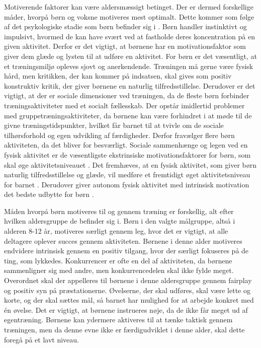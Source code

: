 Motiverende faktorer kan være aldersmæssigt betinget. Der er dermed forskellige måder, hvorpå børn og voksne motiveres mest optimalt. Dette kommer som følge af det psykologiske stadie som børn befinder sig i \citep{V.Brown2007}. Børn handler instinktivt og impulsivt, hvormed de kan have svært ved at fastholde deres koncentration på en given aktivitet. Derfor er det vigtigt, at børnene har en motivationsfaktor som giver dem glæde og lysten til at udføre en aktivitet. \citep{V.Brown2007} \newline
For børn er det væsentligt, at et træningsmiljø opleves sjovt og anerkendende. Træningen må gerne være fysisk hård, men kritikken, der kan kommer på indsatsen, skal gives som positiv konstruktiv kritik, der giver børnene en naturlig tilfredsstillelse. Derudover er det vigtigt, at der er sociale dimensioner ved træningen, da de fleste børn forbinder træningsaktiviteter med et socialt fællesskab. Der opstår imidlertid problemer med gruppetræningsaktiviteter, da børnene kan være forhindret i at møde til de givne træningstidspunkter, hvilket får barnet til at tvivle om de sociale tilhørsforhold og egen udvikling af færdigheder. Derfor fravælger flere børn aktiviteten, da det bliver for besværligt. \citep{Wied2011,Romani2013}\newline
Sociale sammenhænge og legen ved en fysisk aktivitet er de væsentligste  ekstrinsiske motivationsfaktorer for børn, som skal øge aktivitetsniveauet \citep{McWhorter2003,J.Sebire2013}. Det fremhæves, at en fysisk aktivitet, som giver børn naturlig tilfredsstillelse og glæde, vil medføre et fremtidigt øget aktivitetsniveau for barnet \citep{Romani2013}. Derudover giver autonom fysisk aktivitet med intrinsisk motivation det bedste udbytte for børn \citep{J.Sebire2013}.

Måden hvorpå børn motiveres til og gennem træning er forskellig, alt efter hvilken aldersgruppe de befinder sig i. Børn i den valgte målgruppe, altså i alderen 8-12 år, motiveres særligt gennem leg, hvor det er vigtigt, at alle deltagere oplever succes gennem aktiviteten. Børnene i denne alder motiveres endvidere intrinsisk gennem en positiv tilgang, hvor der særligt fokuseres på de ting, som lykkedes. Konkurrencer er ofte en del af aktiviteten, da børnene sammenligner sig med andre, men konkurrencedelen skal ikke fylde meget. Overordnet skal der appelleres til børnene i denne aldersgruppe gennem fairplay og positiv syn på præstationerne. Øvelserne, der skal udføres, skal være lette og korte, og der skal sættes mål, så barnet har mulighed for at arbejde konkret med én øvelse. Det er vigtigt, at børnene instrueres nøje, da de ikke får meget ud af egentræning. Børnene kan ydermere aktiveres til at tænke taktisk gennem træningen, men da denne evne ikke er færdigudviklet i denne alder, skal dette foregå på et lavt niveau. \citep{Wied2011} 

